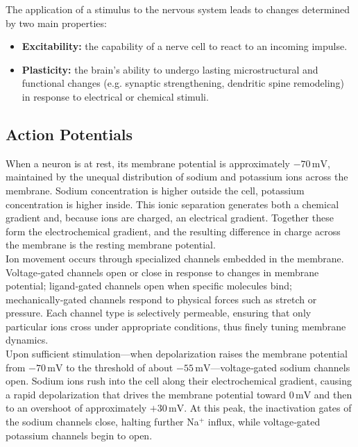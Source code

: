The application of a stimulus to the nervous system leads to changes
determined by two main properties:
\begin{itemize}
      \item \textbf{Excitability:} the capability of a nerve cell to react
            to an incoming impulse.
      \item \textbf{Plasticity:} the brain’s ability to undergo lasting microstructural and functional changes (e.g. synaptic strengthening, dendritic spine remodeling) in response to electrical or chemical stimuli.
\end{itemize}

\subsection{Action Potentials}

When a neuron is at rest, its membrane potential is approximately \(-70\,\mathrm{mV}\), maintained by the unequal distribution of sodium and potassium ions across the membrane. Sodium concentration is higher outside the cell, potassium concentration is higher inside. This ionic separation generates both a chemical gradient and, because ions are charged, an electrical gradient. Together these form the electrochemical gradient, and the resulting difference in charge across the membrane is the resting membrane potential.\\

Ion movement occurs through specialized channels embedded in the membrane. Voltage‑gated channels open or close in response to changes in membrane potential; ligand‑gated channels open when specific molecules bind; mechanically‑gated channels respond to physical forces such as stretch or pressure. Each channel type is selectively permeable, ensuring that only particular ions cross under appropriate conditions, thus finely tuning membrane dynamics.\\

Upon sufficient stimulation—when depolarization raises the membrane potential from \(-70\,\mathrm{mV}\) to the threshold of about \(-55\,\mathrm{mV}\)—voltage‑gated sodium channels open. Sodium ions rush into the cell along their electrochemical gradient, causing a rapid depolarization that drives the membrane potential toward \(0\,\mathrm{mV}\) and then to an overshoot of approximately \(+30\,\mathrm{mV}\). At this peak, the inactivation gates of the sodium channels close, halting further Na\(^+\) influx, while voltage‑gated potassium channels begin to open.\\


